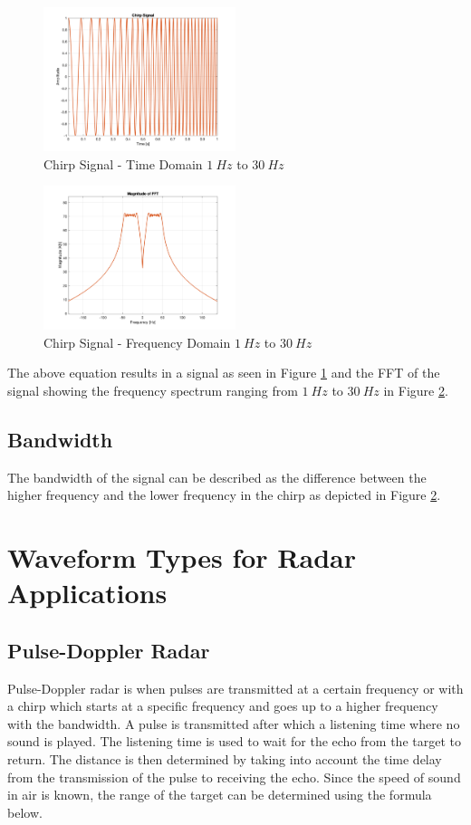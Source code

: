 \begin{figure}[h!]
    \centering
    \includegraphics[width = 0.5\textwidth]{images/chirp.pdf}
    \caption{Chirp Signal - Time Domain $1\ Hz$ to $30\ Hz$}\label{chirpTime}
\end{figure}

\begin{figure}[h!]
    \centering
    \includegraphics[width = 0.5\textwidth]{images/chirpFFT.pdf}
    \caption{Chirp Signal - Frequency Domain $1\ Hz$ to $30\ Hz$}\label{chirpFFT}
\end{figure}

The above equation results in a signal as seen in Figure \ref{chirpTime} and the FFT of the signal showing the frequency spectrum ranging from $1\ Hz$ to $30\ Hz$ in Figure \ref{chirpFFT}. 
\subsection{Bandwidth}
The bandwidth of the signal can be described as the difference between the higher frequency and the lower frequency in the chirp as depicted in Figure \ref{chirpFFT}.

\section{Waveform Types for Radar Applications}

\subsection{Pulse-Doppler Radar}
Pulse-Doppler radar is when pulses are transmitted at a certain frequency or with a chirp which starts at a specific frequency and goes up to a higher frequency with the bandwidth. A pulse is transmitted after which a listening time where no sound is played. The listening time is used to wait for the echo from the target to return. The distance is then determined by taking into account the time delay from the transmission of the pulse to receiving the echo. Since the speed of sound in air is known, the range of the target can be determined using the formula below. \cite{richards_principles_2010}

